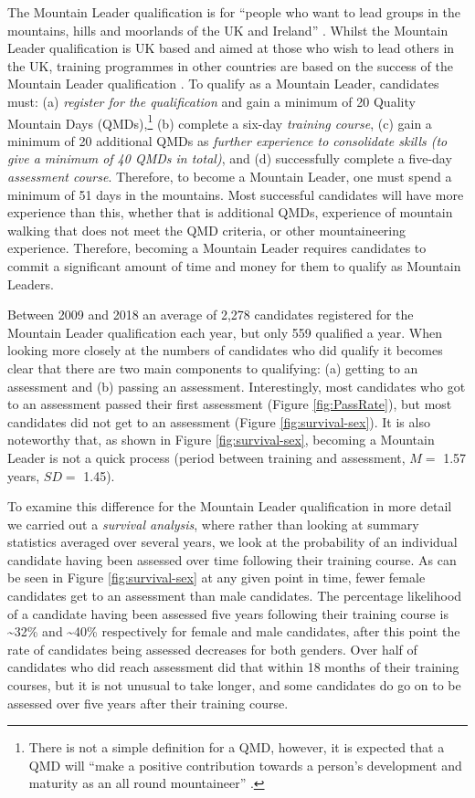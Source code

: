\documentclass[
  12pt,
  a4paper,
]{book}
\begin{document}
The Mountain Leader qualification is for ``people who want to lead groups in the mountains, hills and moorlands of the UK and Ireland'' \citep[p 5]{MTUK2015a}. Whilst the Mountain Leader qualification is UK based and aimed at those who wish to lead others in the UK, training programmes in other countries are based on the success of the Mountain Leader qualification \citep{UIAA2015}. To qualify as a Mountain Leader, candidates must: (a) \emph{register for the qualification} and gain a minimum of 20 Quality Mountain Days (QMDs),\footnote{There is not a simple definition for a QMD, however, it is expected that a QMD will ``make a positive contribution towards a person's development and maturity as an all round mountaineer'' \citep{MountainTraining2019}.} (b) complete a six-day \emph{training course}, (c) gain a minimum of 20 additional QMDs as \emph{further experience to consolidate skills (to give a minimum of 40 QMDs in total)}, and (d) successfully complete a five-day \emph{assessment course}. Therefore, to become a Mountain Leader, one must spend a minimum of 51 days in the mountains. Most successful candidates will have more experience than this, whether that is additional QMDs, experience of mountain walking that does not meet the QMD criteria, or other mountaineering experience. Therefore, becoming a Mountain Leader requires candidates to commit a significant amount of time and money for them to qualify as Mountain Leaders.

Between 2009 and 2018 an average of 2,278 candidates registered for the Mountain Leader qualification each year, but only 559 qualified a year. When looking more closely at the numbers of candidates who did qualify it becomes clear that there are two main components to qualifying: (a) getting to an assessment and (b) passing an assessment. Interestingly, most candidates who got to an assessment passed their first assessment (Figure \ref{fig:PassRate}), but most candidates did not get to an assessment (Figure \ref{fig:survival-sex}). It is also noteworthy that, as shown in Figure \ref{fig:survival-sex}, becoming a Mountain Leader is not a quick process (period between training and assessment, \(M =\) 1.57 years, \(SD =\) 1.45).

To examine this difference for the Mountain Leader qualification in more detail we carried out a \emph{survival analysis}, where rather than looking at summary statistics averaged over several years, we look at the probability of an individual candidate having been assessed over time following their training course. As can be seen in Figure \ref{fig:survival-sex} at any given point in time, fewer female candidates get to an assessment than male candidates. The percentage likelihood of a candidate having been assessed five years following their training course is \textasciitilde32\% and \textasciitilde40\% respectively for female and male candidates, after this point the rate of candidates being assessed decreases for both genders. Over half of candidates who did reach assessment did that within 18 months of their training courses, but it is not unusual to take longer, and some candidates do go on to be assessed over five years after their training course.
\end{document}
